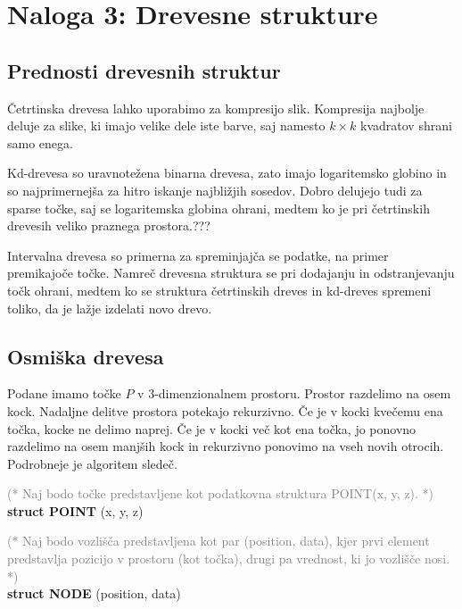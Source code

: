 \documentclass[fleqn]{article}
\begin{document}
\pagebreak
\section*{Naloga 3: Drevesne strukture}

\subsection*{Prednosti drevesnih struktur}

Četrtinska drevesa lahko uporabimo za kompresijo slik. Kompresija najbolje deluje za slike, ki imajo velike dele iste barve, saj namesto $k \times k$ kvadratov shrani samo enega.

Kd-drevesa so uravnotežena binarna drevesa, zato imajo logaritemsko globino in so najprimernejša za hitro iskanje najbližjih sosedov. Dobro delujejo tudi za sparse točke, saj se logaritemska globina ohrani, medtem ko je pri četrtinskih drevesih veliko praznega prostora.???

Intervalna drevesa so primerna za spreminjajča se podatke, na primer premikajoče točke. Namreč drevesna struktura se pri dodajanju in odstranjevanju točk ohrani, medtem ko se struktura četrtinskih dreves in kd-dreves spremeni toliko, da je lažje izdelati novo drevo.

\subsection*{Osmiška drevesa}

Podane imamo točke $P$ v $3$-dimenzionalnem prostoru. 
Prostor razdelimo na osem kock.
Nadaljne delitve prostora potekajo rekurzivno. 
Če je v kocki kvečemu ena točka, kocke ne delimo naprej.
Če je v kocki več kot ena točka, jo ponovno razdelimo na osem manjših kock in rekurzivno ponovimo na vseh novih otrocih.
Podrobneje je algoritem sledeč.

\vspace{2mm}
\noindent
\textcolor{gray}{(* Naj bodo točke predstavljene kot podatkovna struktura POINT(x, y, z). *)} \\
\textbf{struct POINT} (x, y, z)

\vspace{3mm}
\noindent
\textcolor{gray}{(* Naj bodo vozlišča predstavljena kot par (position, data), kjer prvi element predstavlja pozicijo v prostoru (kot točka), drugi pa vrednost, ki jo vozlišče nosi. *)} \\
\textbf{struct NODE} (position, data) 
\end{document}
